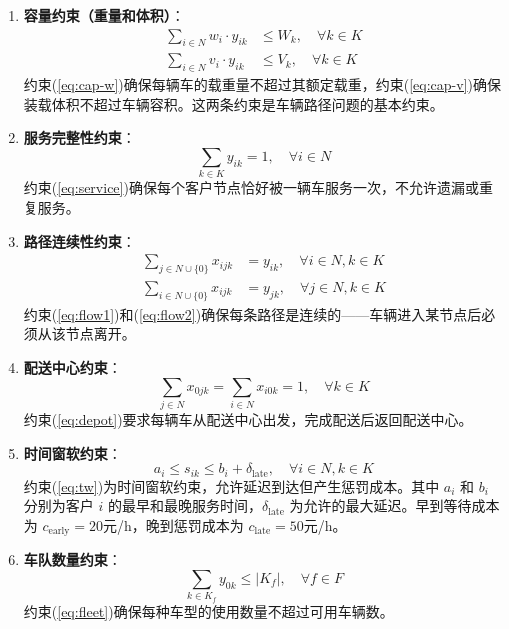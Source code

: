 \documentclass[12pt,letterpaper]{ctexart}
\numberwithin{equation}{section}
\numberwithin{figure}{section}
\numberwithin{table}{section}
\begin{document}
\begin{enumerate}[label=(\arabic*)]
    \item \textbf{容量约束（重量和体积）}：
    \begin{align}
        \sum_{i \in N} w_i \cdot y_{ik} &\leq W_k, \quad \forall k \in K \label{eq:cap-w}\\
        \sum_{i \in N} v_i \cdot y_{ik} &\leq V_k, \quad \forall k \in K \label{eq:cap-v}
    \end{align}
    约束(\ref{eq:cap-w})确保每辆车的载重量不超过其额定载重，约束(\ref{eq:cap-v})确保装载体积不超过车辆容积。这两条约束是车辆路径问题的基本约束。

    \item \textbf{服务完整性约束}：
    \begin{equation}
        \sum_{k \in K} y_{ik} = 1, \quad \forall i \in N \label{eq:service}
    \end{equation}
    约束(\ref{eq:service})确保每个客户节点恰好被一辆车服务一次，不允许遗漏或重复服务。

    \item \textbf{路径连续性约束}：
    \begin{align}
        \sum_{j \in N \cup \{0\}} x_{ijk} &= y_{ik}, \quad \forall i \in N, k \in K \label{eq:flow1}\\
        \sum_{i \in N \cup \{0\}} x_{ijk} &= y_{jk}, \quad \forall j \in N, k \in K \label{eq:flow2}
    \end{align}
    约束(\ref{eq:flow1})和(\ref{eq:flow2})确保每条路径是连续的——车辆进入某节点后必须从该节点离开。

    \item \textbf{配送中心约束}：
    \begin{equation}
        \sum_{j \in N} x_{0jk} = \sum_{i \in N} x_{i0k} = 1, \quad \forall k \in K \label{eq:depot}
    \end{equation}
    约束(\ref{eq:depot})要求每辆车从配送中心出发，完成配送后返回配送中心。

    \item \textbf{时间窗软约束}：
    \begin{equation}
        a_i \leq s_{ik} \leq b_i + \delta_{\text{late}}, \quad \forall i \in N, k \in K \label{eq:tw}
    \end{equation}
    约束(\ref{eq:tw})为时间窗软约束，允许延迟到达但产生惩罚成本。其中 $a_i$ 和 $b_i$ 分别为客户 $i$ 的最早和最晚服务时间，$\delta_{\text{late}}$ 为允许的最大延迟。早到等待成本为 $c_{\text{early}}=20$元/h，晚到惩罚成本为 $c_{\text{late}}=50$元/h。

    \item \textbf{车队数量约束}：
    \begin{equation}
        \sum_{k \in K_f} y_{0k} \leq |K_f|, \quad \forall f \in F \label{eq:fleet}
    \end{equation}
    约束(\ref{eq:fleet})确保每种车型的使用数量不超过可用车辆数。
\end{enumerate}
\end{document}
